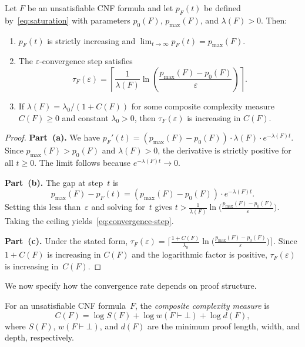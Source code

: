 \begin{theorem}\label{thm:convergence}
Let $F$ be an unsatisfiable CNF formula and let $p_F(t)$ be defined
by~\eqref{eq:saturation} with parameters $p_0(F)$, $p_{\max}(F)$, and
$\lambda(F) > 0$.  Then:
\begin{enumerate}[label=(\alph*)]
\item $p_F(t)$ is strictly increasing and $\lim_{t \to \infty} p_F(t)
  = p_{\max}(F)$.
\item The $\varepsilon$-convergence step satisfies
\begin{equation}\label{eq:convergence-step}
\tau_F(\varepsilon) = \left\lceil
  \frac{1}{\lambda(F)} \ln\!\left(
  \frac{p_{\max}(F) - p_0(F)}{\varepsilon}\right)\right\rceil.
\end{equation}
\item If $\lambda(F) = \lambda_0 / (1 + C(F))$ for some composite complexity
  measure $C(F) \ge 0$ and constant $\lambda_0 > 0$, then $\tau_F(\varepsilon)$
  is increasing in $C(F)$.
\end{enumerate}
\end{theorem}

\begin{proof}
\textbf{Part~(a).}  We have
$p_F'(t) = (p_{\max}(F) - p_0(F)) \cdot \lambda(F) \cdot e^{-\lambda(F) t}$.
Since $p_{\max}(F) > p_0(F)$ and $\lambda(F) > 0$, the derivative is strictly
positive for all $t \ge 0$.  The limit follows because
$e^{-\lambda(F) t} \to 0$.

\textbf{Part~(b).}  The gap at step~$t$ is
\[
p_{\max}(F) - p_F(t) = (p_{\max}(F) - p_0(F)) \cdot e^{-\lambda(F) t}.
\]
Setting this less than~$\varepsilon$ and solving for~$t$ gives
$t > \frac{1}{\lambda(F)} \ln\!\bigl(\frac{p_{\max}(F) - p_0(F)}{\varepsilon}
\bigr)$.  Taking the ceiling yields~\eqref{eq:convergence-step}.

\textbf{Part~(c).}  Under the stated form,
$\tau_F(\varepsilon) = \lceil \frac{1 + C(F)}{\lambda_0}
\ln\!\bigl(\frac{p_{\max}(F) - p_0(F)}{\varepsilon}\bigr) \rceil$.
Since $1 + C(F)$ is increasing in $C(F)$ and the logarithmic factor is
positive, $\tau_F(\varepsilon)$ is increasing in~$C(F)$.
\end{proof}

We now specify how the convergence rate depends on proof structure.

\begin{definition}\label{def:composite}
For an unsatisfiable CNF formula~$F$, the \emph{composite complexity measure}
is
\begin{equation}\label{eq:composite}
C(F) = \log S(F) + \log w(F \vdash \bot) + \log d(F),
\end{equation}
where $S(F)$, $w(F \vdash \bot)$, and $d(F)$ are the minimum proof length,
width, and depth, respectively.
\end{definition}

